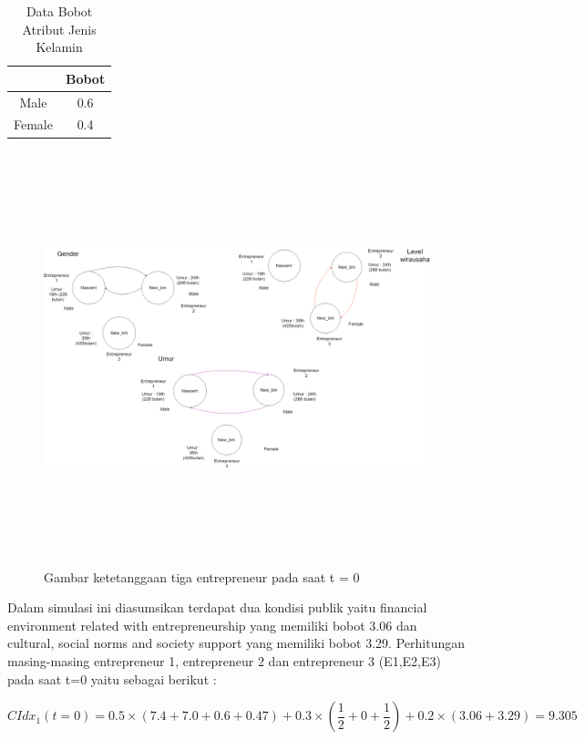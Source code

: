 \begin{table} [H]
\centering
\caption{Data Bobot Atribut Jenis Kelamin}
\begin{tabular}{|c|c|}
\hline
& Bobot\\
\hline
Male & 0.6\\
\hline
Female & 0.4\\
\hline
\end{tabular}
\end{table}
				

	\begin{figure} [H]
		\centering  
		\includegraphics[width=18cm, height=12cm]{gambarwirausahaawal} 
		\caption[Gambar ketetanggaan tiga entrepreneur pada saat t = 0]{Gambar ketetanggaan tiga entrepreneur pada saat t = 0} 
		\label{fig:t0} 
	\end{figure}


Dalam simulasi ini diasumsikan terdapat dua kondisi publik yaitu financial environment related with entrepreneurship yang memiliki bobot 3.06 dan cultural, social norms and society support yang memiliki bobot 3.29. Perhitungan masing-masing entrepreneur 1, entrepreneur 2 dan entrepreneur 3 (E1,E2,E3) pada saat t=0 yaitu sebagai berikut :
	

\begin{equation}
	CIdx_{1}(t=0) = 0.5 \times (7.4 + 7.0 + 0.6 + 0.47) + 0.3 \times (\frac {1} {2} + 0 +  \frac {1} {2}) + 0.2 \times (3.06 + 3.29) = 9.305
\end{equation}	

